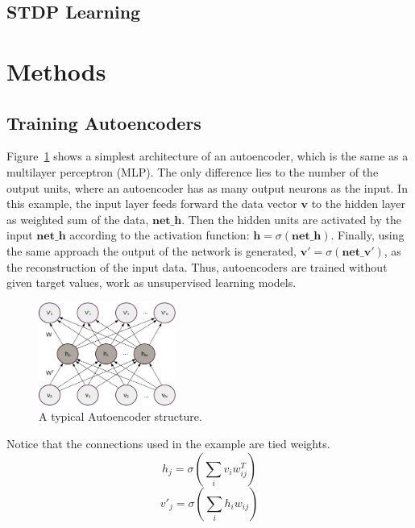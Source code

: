 \documentclass[conference]{IEEEtran}
\begin{document}
\subsection{STDP Learning}

\section{Methods}
%
\subsection{Training Autoencoders}
	Figure~\ref{fig:AE} shows a simplest architecture of an autoencoder, which is the same as a multilayer perceptron (MLP).
	The only difference lies to the number of the output units, where an autoencoder has as many output neurons as the input.
	In this example, the input layer feeds forward the data vector $\mathbf{v}$ to the hidden layer as weighted sum of the data, $\mathbf{net\_h}$.
	Then the hidden units are activated by the input $\mathbf{net\_h}$ according to the activation function: $\mathbf{h}=\sigma(\mathbf{net\_h})$.
	Finally, using the same approach the output of the network is generated, $\mathbf{v'}=\sigma(\mathbf{net\_v'})$, as the reconstruction of the input data.
	Thus, autoencoders are trained without given target values, work as unsupervised learning models.	
	\begin{figure}
		\centering
			\includegraphics[width=0.4\textwidth]{AE}
			\caption{A typical Autoencoder structure.}
			\label{fig:AE}
	\end{figure}
	
	Notice that the connections used in the example are tied weights.
	\begin{equation}
	h_j=\sigma(\sum_i v_i w^T_{ij})
	\end{equation}
	\begin{equation}
	v'_j=\sigma(\sum_i h_i w_{ij})
	\end{equation}
	
\end{document}
